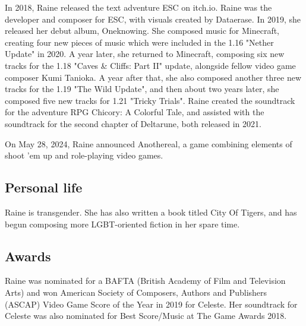 In 2018, Raine released the text adventure ESC on itch.io.
Raine was the developer and composer for ESC, with visuals created by Dataerase.
In 2019, she released her debut album, Oneknowing.
She composed music for Minecraft, creating four new pieces of music which were included in the 1.16 "Nether Update" in 2020.
A year later, she returned to Minecraft, composing six new tracks for the 1.18 "Caves \&{} Cliffs: Part II" update, alongside fellow video game composer Kumi Tanioka.
A year after that, she also composed another three new tracks for the 1.19 "The Wild Update", and then about two years later, she composed five new tracks for 1.21 "Tricky Trials".
Raine created the soundtrack for the adventure RPG Chicory: A Colorful Tale, and assisted with the soundtrack for the second chapter of Deltarune, both released in 2021.

On May 28, 2024, Raine announced Anothereal, a game combining elements of shoot 'em up and role-playing video games.

\subsection{Personal life}

Raine is transgender.
She has also written a book titled City Of Tigers, and has begun composing more LGBT-oriented fiction in her spare time.

\subsection{Awards}

Raine was nominated for a BAFTA (British Academy of Film and Television Arts) and won American Society of Composers, Authors and Publishers (ASCAP) Video Game Score of the Year in 2019 for Celeste. Her soundtrack for Celeste was also nominated for Best Score/Music at The Game Awards 2018.
